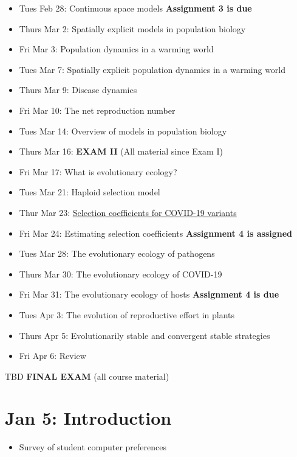 \documentclass[
]{book}
\providecommand{\tightlist}{%
  \setlength{\itemsep}{0pt}\setlength{\parskip}{0pt}}
\begin{document}
\begin{itemize}
\tightlist
\item
  Tues Feb 28: Continuous space models \textbf{Assignment 3 is due}
\item
  Thurs Mar 2: Spatially explicit models in population biology
\item
  Fri Mar 3: Population dynamics in a warming world
\item
  Tues Mar 7: Spatially explicit population dynamics in a warming world
\item
  Thurs Mar 9: Disease dynamics
\item
  Fri Mar 10: The net reproduction number
\item
  Tues Mar 14: Overview of models in population biology
\item
  Thurs Mar 16: \textbf{EXAM II} (All material since Exam I)
\item
  Fri Mar 17: What is evolutionary ecology?
\item
  Tues Mar 21: Haploid selection model
\item
  Thur Mar 23: \href{https://www.zoology.ubc.ca/~otto/Talks/SSE2022_Otto.pdf}{Selection coefficients for COVID-19 variants}
\item
  Fri Mar 24: Estimating selection coefficients \textbf{Assignment 4 is assigned}
\item
  Tues Mar 28: The evolutionary ecology of pathogens
\item
  Thurs Mar 30: The evolutionary ecology of COVID-19
\item
  Fri Mar 31: The evolutionary ecology of hosts \textbf{Assignment 4 is due}
\item
  Tues Apr 3: The evolution of reproductive effort in plants
\item
  Thurs Apr 5: Evolutionarily stable and convergent stable strategies
\item
  Fri Apr 6: Review
\end{itemize}

TBD \textbf{FINAL EXAM} (all course material)

\hypertarget{jan-5-introduction}{%
\chapter{Jan 5: Introduction}\label{jan-5-introduction}}

\begin{itemize}
\tightlist
\item
  Survey of student computer preferences
\end{itemize}
\end{document}
